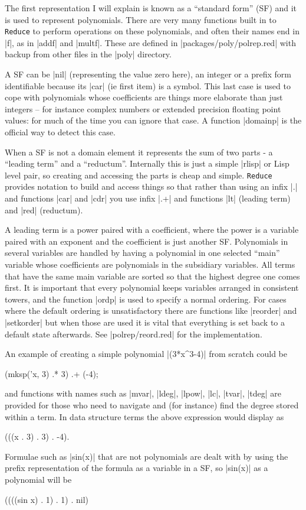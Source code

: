 \documentclass[12pt,twoside,openright]{memoir}
\newcommand{\reduce}{\texttt{Reduce}\xspace}
\begin{document}
The first representation I will explain is known as a ``standard form'' (SF) and
it is used to represent polynomials. There are very many functions built
in to \reduce to perform operations on these polynomials, and often their
names end in |f|, as in |addf| and |multf|. These are defined in
|packages/poly/polrep.red| with backup from other files in the |poly| directory.

A SF can be |nil| (representing the value zero here), an integer or a prefix
form identifiable because its |car| (ie first item) is a symbol. This last
case is used to cope with polynomials whose coefficients are things more
elaborate than just integers -- for instance complex numbers or extended
precision floating point values: for much of the time you can ignore that
case. A function |domainp| is the official way to detect this case.

When a SF is not a domain element it represents the sum of two parts - a
``leading term'' and a ``reductum''. Internally this is just a simple |rlisp|
or Lisp level pair, so creating and accessing the parts is cheap and simple.
\reduce provides notation to build and access things so that rather than using
an infix |.| and functions |car| and |cdr| you use infix
|.+| and functions |lt| (leading term) and |red| (reductum).

A leading term is a power paired with a coefficient, where the power is a
variable paired with an exponent and the coefficient is just another SF.
Polynomials in several variables are handled by having a polynomial in one
selected ``main'' variable whose coefficients are polynomials in the subsidiary
variables. All terms that have the same main variable are sorted so
that the highest degree one comes first. It is important that every polynomial
keeps variables arranged in consistent towers, and the function |ordp| is used
to specify a normal ordering. For cases where the default ordering is
unsatisfactory there are functions like |reorder| and |setkorder| but when
those are used it is vital that everything is set back to a default state
afterwards. See |polrep/reord.red| for the implementation.

An example of creating a simple polynomial |(3*x^3-4)| from scratch could
be
\begin{rlispverb}
   (mksp('x, 3) .* 3) .+ (-4);
\end{rlispverb}
and functions with names such as |mvar|, |ldeg|, |lpow|,
|lc|, |tvar|, |tdeg| are provided
for those who need to navigate and (for instance) find the degree
stored within a term. In data structure terms the above expression would
display as
\begin{rlispverb}
   (((x . 3) . 3) . -4).
\end{rlispverb}
Formulae such as |sin(x)| that are not polynomials are dealt with by using
the prefix representation of the formula as a variable in a SF, so
|sin(x)| as a polynomial will be
\begin{rlispverb}
   ((((sin x) . 1) . 1) . nil)
\end{rlispverb}
\end{document}

